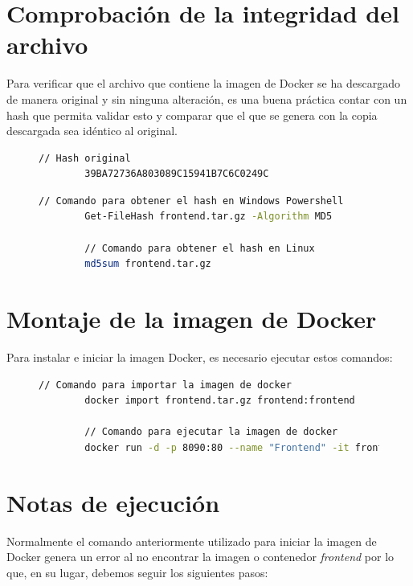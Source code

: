 \documentclass[11pt,a4paper]{article}
\begin{document}
\vspace{5cm}

\section{Comprobación de la integridad del archivo}
Para verificar que el archivo que contiene la imagen de Docker se ha descargado de manera original 
y sin ninguna alteración, es una buena práctica contar con un hash que permita validar esto y comparar
que el que se genera con la copia descargada sea idéntico al original.\par

\begin{figure}[h]
    \begin{lstlisting}[language=Bash]
        // Hash original
        39BA72736A803089C15941B7C6C0249C
    \end{lstlisting}
\end{figure}

\begin{figure}[h]
    \begin{lstlisting}[language=Bash]
        // Comando para obtener el hash en Windows Powershell
        Get-FileHash frontend.tar.gz -Algorithm MD5

        // Comando para obtener el hash en Linux
        md5sum frontend.tar.gz
    \end{lstlisting}
\end{figure}

\newpage

\section{Montaje de la imagen de Docker}
Para instalar e iniciar la imagen Docker, es necesario ejecutar estos comandos:

\begin{figure}[h]
    \begin{lstlisting}[language=Bash]
        // Comando para importar la imagen de docker
        docker import frontend.tar.gz frontend:frontend

        // Comando para ejecutar la imagen de docker
        docker run -d -p 8090:80 --name "Frontend" -it frontend nginx -g "daemon off;"
    \end{lstlisting}
\end{figure}

\section{Notas de ejecución}
Normalmente el comando anteriormente utilizado para iniciar la imagen de Docker 
genera un error al no encontrar la imagen o contenedor \textit{frontend} por lo que, 
en su lugar, debemos seguir los siguientes pasos:\par
\end{document}
